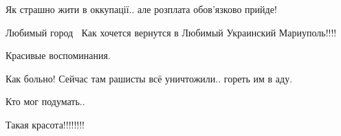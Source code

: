 
Як страшно жити в оккупації.. але розплата обов'язково прийде!


Любимый город 🥰😭Как хочется вернутся в Любимый Украинский Мариуполь!!!!


Красивые воспоминания.


Как больно! Сейчас там рашисты всё уничтожили.. гореть им в аду.


Кто мог подумать..


Такая красота!!!!!!!!
